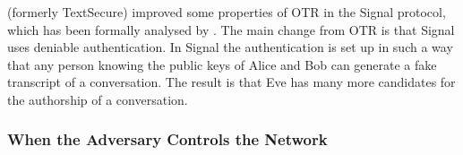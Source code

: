 \textcite{SignalApp} (formerly TextSecure) improved some properties of \ac{OTR} 
in the Signal protocol, which has been formally analysed by 
\textcite{TextSecureAnalysis,SignalProtocolAnalysis}.
The main change from \ac{OTR} is that Signal uses deniable authentication.
In Signal the authentication is set up in such a way that any person knowing 
the public keys of Alice and Bob can generate a fake transcript of 
a conversation.
The result is that Eve has many more candidates for the authorship of 
a conversation.

\subsubsection{When the Adversary Controls the Network}
\label{WhenAdversaryControlsNetwork}


